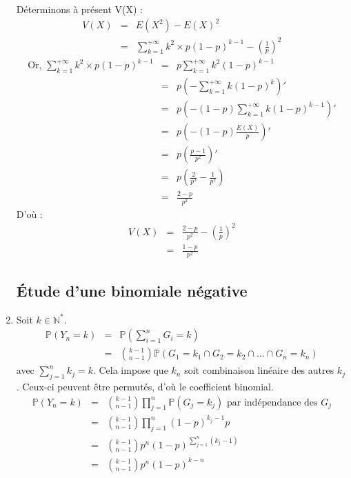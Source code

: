 \documentclass{article}
\begin{document}
\begin{enumerate}
\newpage
Déterminons à présent V(X) : 
\begin{eqnarray*}
V(X)&=&E(X^2)-E(X)^2 \\
    &=&\sum_{k=1}^{+\infty} k^2\times p (1-p)^{k-1} - \left(\frac{1}{p}\right)^2 
\end{eqnarray*}
\begin{eqnarray*}
\text{Or, }\sum_{k=1}^{+\infty} k^2\times p (1-p)^{k-1} &=& p \sum_{k=1}^{+\infty} k^2 (1-p)^{k-1} \\
						&=& p \left( -\sum_{k=1}^{+\infty} k (1-p)^k \right) ' \\
						&=& p \left( -(1-p) \sum_{k=1}^{+\infty} k(1-p)^{k-1} \right) ' \\
						&=& p \left( -(1-p) \frac{E(X)}{p} \right) ' \\
						&=& p\left( \frac{p-1}{p^2} \right) ' \\
						&=& p\left( \frac{2}{p^3} - \frac{1}{p^2} \right) \\
						&=& \frac{2-p}{p^2}
\end{eqnarray*}
D'où :
\begin{eqnarray*}
V(X)&=&\frac{2-p}{p^2} - \left(\frac{1}{p}\right)^2 \\
    &=&\frac{1-p}{p^2}
\end{eqnarray*}


\subsection{Étude d'une binomiale négative}
\item Soit $k\in\mathbb{N}^*$. 
\begin{eqnarray*}
\mathbb{P}(Y_n=k)&=&\mathbb{P}(\sum_{i=1}^n G_i =k) \\
		&=& \binom{k-1}{n-1}\mathbb{P}(G_1=k_1 \cap G_2=k_2 \cap ... \cap G_n=k_n)
\end{eqnarray*}
avec $\sum_{j=1}^n k_j = k$. Cela impose que $k_n$ soit combinaison linéaire des autres $k_j$. Ceux-ci peuvent être permutés, d'où le coefficient binomial.
\begin{eqnarray*}
\mathbb{P}(Y_n=k)&=&\binom{k-1}{n-1} \prod_{j=1}^n \mathbb{P}(G_j=k_j) \text{ par indépendance des } G_j\\
		&=&\binom{k-1}{n-1} \prod_{j=1}^n (1-p)^{k_j-1}p\\
		&=&\binom{k-1}{n-1} p^n(1-p)^{\sum_{j=1}^n (k_j -1)} \\
		&=&\binom{k-1}{n-1} p^n(1-p)^{k-n} 
\end{eqnarray*}


\end{enumerate}
\end{document}
